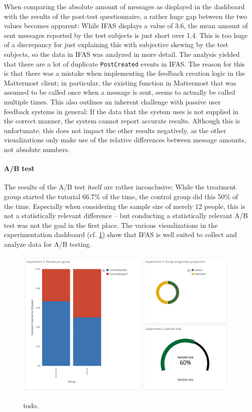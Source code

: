 When comparing the absolute amount of messages as displayed in the dashboard with the results of the post-test questionnaire, a rather huge gap between the two values becomes apparent:
While \ac{IFAS} displays a value of 3.6, the mean amount of sent messages reported by the test subjects is just short over 1.4.
This is too huge of a discrepancy for just explaining this with subjective skewing by the test subjects, so the data in \ac{IFAS} was analyzed in more detail.
The analysis yielded that there are a lot of duplicate \texttt{PostCreated} events in \ac{IFAS}.
The reason for this is that there was a mistake when implementing the feedback creation logic in the Mattermost client; in particular, the existing function in Mattermost that was assumed to be called once when a message is sent, seems to actually be called multiple times.
This also outlines an inherent challenge with passive user feedback systems in general: If the data that the system uses is not supplied in the correct manner, the system cannot report accurate results.
Although this is unfortunate, this does not impact the other results negatively, as the other visualizations only make use of the relative differences between message amounts, not absolute numbers.


\paragraph{A/B test}

The results of the A/B test itself are rather inconclusive: While the treatment group started the tutorial 66.7\% of the time, the control group did this 50\% of the time.
Especially when considering the sample size of merely 12 people, this is not a statistically relevant difference -- but conducting a statistically relevant A/B test was not the goal in the first place.
The various visualizations in the experimentation dashboard (cf. \cref{figure:evaluation:user:dashboard-ab-test}) show that \ac{IFAS} is well suited to collect and analyze data for A/B testing.

\begin{figure}[h]
        \caption{todo.}
        \includegraphics[width=1.1\textwidth]{gfx/dashboard-ab-test.png}
        \label{figure:evaluation:user:dashboard-ab-test}
\end{figure}

